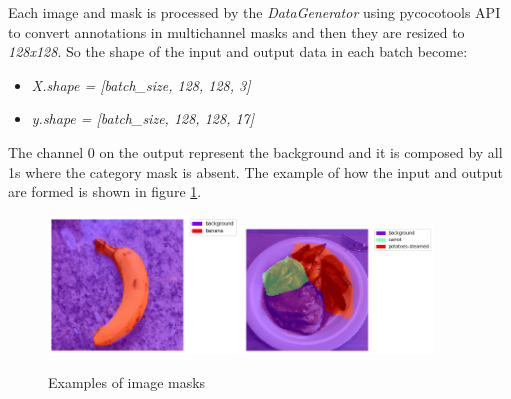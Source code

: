\documentclass[a4paper,10pt]{report}
\begin{document}
Each image and mask is processed by the \textit{DataGenerator} using pycocotools API \cite{cocoapi} to convert annotations in multichannel masks and then they are resized to \textit{128x128}. So the shape of the input and output data in each batch become:
\begin{itemize}
    \item \emph{X.shape = [batch_size, 128, 128, 3]}
    \item \emph{y.shape = [batch_size, 128, 128, 17]}
\end{itemize}
The channel 0 on the output represent the background and it is composed by all 1s where the category
mask is absent. The example of how the input and output are formed is shown in figure \ref{fig:example_masks}.

\begin{figure}[h]
    \centering
    \includegraphics[width=0.45\textwidth]{assets/img/banana.png}
    \includegraphics[width=0.45\textwidth]{assets/img/potatoes.png}
    \caption{Examples of image masks}
    \label{fig:example_masks}
\end{figure}
\end{document}

